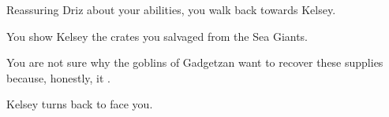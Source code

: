 
Reassuring Driz about your abilities, you walk back towards Kelsey.



You show Kelsey the crates you salvaged from the Sea Giants.


You are not sure why the goblins of Gadgetzan want to recover these supplies because, honestly, it .  %




Kelsey turns back to face you.

